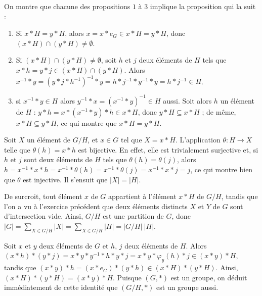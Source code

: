 \begin{sol}
On montre que chacune des propositions $1$ à $3$ implique
la proposition qui la suit :
\begin{enumerate}
\item Si $x \ast H = y \ast H$, alors $x = x \ast e_G \in x \ast H = y \ast H$, donc
$(x \ast H) \cap (y \ast H) \neq \emptyset$.
\item Si $(x \ast H) \cap (y \ast H) \neq \emptyset$, soit $h$ et $j$ deux éléments de $H$ tels que
$x \ast h = y \ast j \in (x \ast H) \cap (y \ast H)$. Alors
$x^{-1} \ast y = (y \ast j \ast h^{-1})^{-1} \ast y = h \ast j^{-1} \ast y^{-1} \ast y = h \ast j^{-1} \in H$.
\item si $x^{-1} \ast y \in H$ alors $y^{-1} \ast x = (x^{-1} \ast y)^{-1} \in H$ aussi.
Soit alors $h$ un élément de $H$ :
$y \ast h = x \ast (x^{-1} \ast y) \ast h \in x \ast H$, donc $y \ast H \subseteq x \ast H$ ;
de même, $x \ast H \subseteq y \ast H$, ce qui montre que
$x \ast H = y \ast H$.
\end{enumerate}
\end{sol}

\begin{sol}
Soit $X$ un élément de $G / H$, et $x \in G$ tel que $X = x \ast H$.
L'application $\theta : H \to X$ telle que $\theta(h) = x \ast h$ est bijective.
En effet, elle est trivialement surjective et,
si $h$ et $j$ sont deux éléments de $H$ tels que $\theta(h) = \theta(j)$, alors
$h = x^{-1} \ast x \ast h = x^{-1} \ast \theta(h) = x^{-1} \ast \theta(j) = x^{-1} \ast x \ast j = j$,
ce qui montre bien que $\theta$ est injective.
Il s'ensuit que $\vert X \vert = \vert H \vert$.

De surcroit, tout élément $x$ de $G$ appartient à l'élément $x \ast H$ de $G / H$,
tandis que l'on a vu à l'exercice précédent que
deux éléments distincts $X$ et $Y$ de $G$ sont d'intersection vide.
Ainsi, $G / H$ est une partition de $G$, donc
$\vert G \vert = \sum_{X \in G / H} \vert X \vert =
\sum_{X \in G / H} \vert H \vert = \vert G / H \vert ~ \vert H \vert$.
\end{sol}

\begin{sol}
Soit $x$ et $y$ deux éléments de $G$ et $h$, $j$ deux éléments de $H$. Alors
$(x \ast h) \ast (y \ast j) = x \ast y \ast y^{-1} \ast h \ast y \ast j =
x \ast y \ast \varphi_y(h) \ast j \in (x \ast y) \ast H$, tandis que
$(x \ast y) \ast h = (x \ast e_G) \ast (y \ast h) \in (x \ast H) \ast (y \ast H)$.
Ainsi, $(x \ast H) \ast (y \ast H) = (x \ast y) \ast H$.
Puisque $(G, \ast)$ est un groupe, on déduit immédiatement de cette identité que
$(G / H, \ast)$ est un groupe aussi.
\end{sol}


